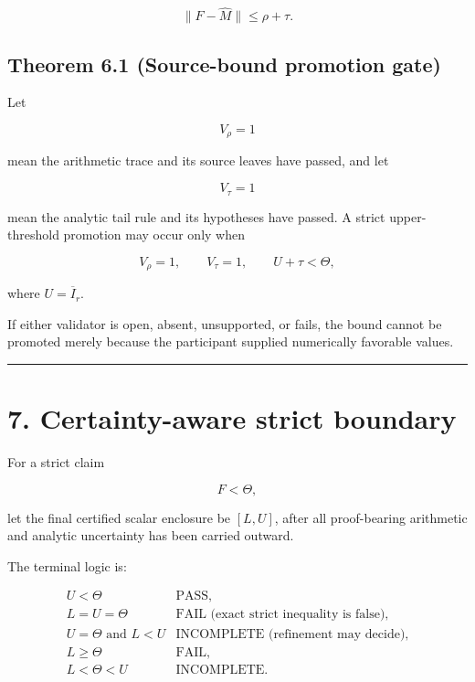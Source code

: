 \[
\boxed{
\|F-\widehat M\|
\le
\rho+\tau.
}
\tag{6.3}
\]

\hypertarget{theorem-6.1-source-bound-promotion-gate}{%
\subsection{Theorem 6.1 (Source-bound promotion gate)}\label{theorem-6.1-source-bound-promotion-gate}}

Let

\[
V_\rho=1
\]

mean the arithmetic trace and its source leaves have passed, and let

\[
V_\tau=1
\]

mean the analytic tail rule and its hypotheses have passed. A strict upper-threshold promotion may occur only when

\[
\boxed{
V_\rho=1,
\qquad
V_\tau=1,
\qquad
U+\tau<\Theta,
}
\tag{6.4}
\]

where \(U=\overline I_r\).

If either validator is open, absent, unsupported, or fails, the bound cannot be promoted merely because the participant supplied numerically favorable values.

\begin{center}\rule{0.5\linewidth}{0.5pt}\end{center}

\hypertarget{certainty-aware-strict-boundary}{%
\section{7. Certainty-aware strict boundary}\label{certainty-aware-strict-boundary}}

For a strict claim

\[
F<\Theta,
\]

let the final certified scalar enclosure be \([L,U]\), after all proof-bearing arithmetic and analytic uncertainty has been carried outward.

The terminal logic is:

\[
\boxed{
\begin{array}{ll}
U<\Theta
& \text{PASS},\\[2mm]
L=U=\Theta
& \text{FAIL (exact strict inequality is false)},\\[2mm]
U=\Theta\text{ and }L<U
& \text{INCOMPLETE (refinement may decide)},\\[2mm]
L\ge\Theta
& \text{FAIL},\\[2mm]
L<\Theta<U
& \text{INCOMPLETE}.
\end{array}
}
\tag{7.1}
\]

